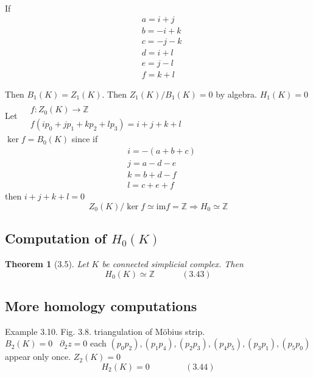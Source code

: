 \documentclass{book}
\newtheorem{theorem}{Theorem}
\begin{document}
If 
\[
\begin{aligned}
  & a = i + j \\ 
  & b = -i + k \\ 
  & c = -j -k \\ 
  & d = i + l \\
  & e = j - l \\
  & f = k + l 
\end{aligned}
\]

Then $B_1(K) = Z_1(K)$.  Then $Z_1(K)/B_1(K) = 0$ by algebra.  $\boxed{ H_1(K) = 0 }$ \\

Let $\begin{aligned} & \quad \\ 
  & f: Z_0(K) \to \mathbb{Z}  \\
  & f(ip_0 + jp_1 + k p_2 + l p_3) = i + j +k + l \end{aligned}$ \\

$\ker{f} = B_0(K)$ since if
\[
\begin{aligned}
  & i = - ( a + b+ c) \\ 
  & j = a-  d  -e \\ 
  & k = b + d - f \\ 
  & l = c + e+ f 
\end{aligned}
\]
then $i+j + k + l =0$ 
\[
Z_0(K)/ \ker{f} \simeq \text{im}{f} = \mathbb{Z} \Longrightarrow \boxed{ H_0 \simeq \mathbb{Z}}
\]

\subsection{Computation of $H_0(K)$}

\begin{theorem}[3.5] Let $K$ be \emph{connected} simplicial complex.  Then
\begin{equation}
  H_0(K) \simeq \mathbb{Z} \quad \quad \quad \, (3.43)
\end{equation}
\end{theorem}

\subsection{More homology computations}

Example 3.10.  Fig. 3.8. triangulation of M\"{o}bius strip. \\
$B_2(K) =0$ \, $\partial_2 z =0$ each $(p_0 p_2), (p_1 p_4), (p_2 p_3), (p_4p_5), (p_3 p_1), (p_5p_0)$ appear only once.  $Z_2(K)=0$ 
\begin{equation}
H_2(K)= 0 \quad \quad \quad \quad \, (3.44)
\end{equation}
\end{document}
